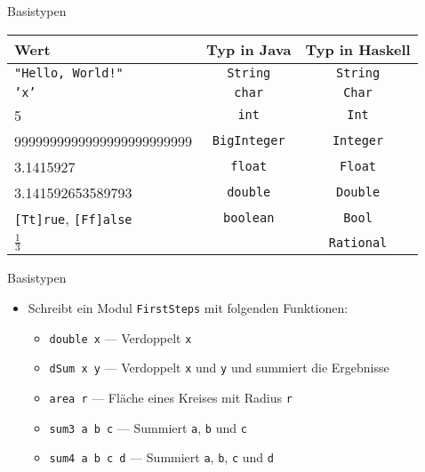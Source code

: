 \documentclass{beamer}
\begin{document}
\begin{frame}{Basistypen}
	\begin{tabular}{ l | c | c }
		Wert & Typ in Java & Typ in Haskell \\
		\hline
		\texttt{"Hello, World!"} & \texttt{String} & \pause \texttt{String} \\
		\texttt{'x'} & \texttt{char} & \pause \texttt{Char} \\
		5 & \texttt{int} & \pause \texttt{Int} \\
		9999999999999999999999999 & \texttt{BigInteger} & \pause \texttt{Integer} \\
		3.1415927 & \texttt{float} & \pause \texttt{Float} \\
		3.141592653589793 & \texttt{double} & \pause \texttt{Double} \\
		\texttt{[Tt]rue}, \texttt{[Ff]alse} & \texttt{boolean} & \pause \texttt{Bool} \\
		$\frac{1}{3}$ & \false & \pause \texttt{Rational} \\
	\end{tabular}
\end{frame}

\begin{frame}{Basistypen}

	\begin{itemize}
		\item Schreibt ein Modul \texttt{FirstSteps} mit folgenden Funktionen:
		\begin{itemize}
			\item \texttt{double x} --- Verdoppelt \texttt{x}
			\item \texttt{dSum x y} --- Verdoppelt \texttt{x} und \texttt{y} und summiert die Ergebnisse
			\item \texttt{area r} --- Fläche eines Kreises mit Radius \texttt{r}
			\item \texttt{sum3 a b c} --- Summiert \texttt{a}, \texttt{b} und \texttt{c}
			\item \texttt{sum4 a b c d} --- Summiert \texttt{a}, \texttt{b}, \texttt{c} und \texttt{d}
		\end{itemize}
	\end{itemize}
\end{frame}
\end{document}
